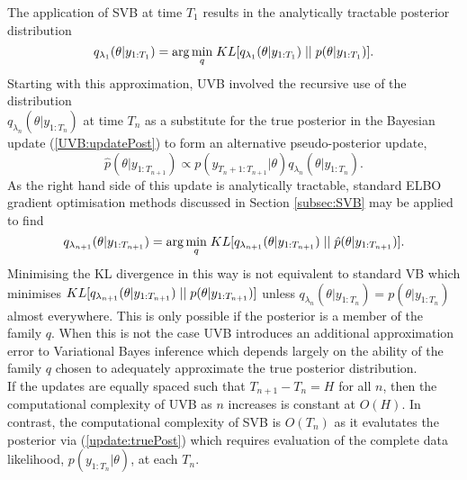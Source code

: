 \documentclass[
12pt, %
onehalfspacing, %
nohyperref, %
headsepline, %
chapterinoneline, %
]{MastersDoctoralThesis} %
\begin{document}
The application of SVB at time $T_1$ results in the analytically tractable posterior distribution
\begin{equation}
\label{UVB:Time1}
q_{\lambda_1}(\theta | y_{1:T_1}) = \arg \underset{q}{\min} \hspace{1mm} KL[q_{\lambda_1} (\theta | y_{1:T_1}) \hspace{.1cm}||\hspace{.1cm}p(\theta | y_{1:T_1})].
\end{equation}
Starting with this approximation, UVB involved the recursive use of the distribution \\ $q_{\lambda_n}(\theta | y_{1:T_n})$ at time $T_n$ as a substitute for the true posterior in the Bayesian update (\ref{UVB:updatePost}) to form an alternative pseudo-posterior update,
\begin{equation}
\label{UVB:pHatPosterior}
\hat{p}(\theta |  y_{1:T_{n+1}}) \propto p(y_{T_{n}+1:T_{n+1}} | \theta)q_{\lambda_{n}}(\theta | y_{1:T_{n}}).
\end{equation}
As the right hand side of this update is analytically tractable, standard ELBO gradient optimisation methods discussed in Section \ref{subsec:SVB} may be applied to find  
\begin{equation}
\label{UVB:TimeNp1}
q_{\lambda_{n+1}}(\theta | y_{1:T_{n+1}}) = \arg \underset{q}{\min} \hspace{1mm} KL[q_{\lambda_{n+1}} (\theta | y_{1:T_{n+1}}) \hspace{.1cm}||\hspace{.1cm}\hat{p}(\theta | y_{1:T_{n+1}})].
\end{equation}
Minimising the KL divergence in this way is not equivalent to standard VB which minimises $KL[q_{\lambda_{n+1}} (\theta | y_{1:T_{n+1}}) \hspace{.1cm}||\hspace{.1cm}p(\theta | y_{1:T_{n+1}})]$ unless $q_{\lambda_{n}}(\theta |  y_{1:T_{n}}) = p(\theta |  y_{1:T_{n}})$ almost everywhere. This is only possible if the posterior is a member of the family $q$. When this is not the case UVB introduces an additional approximation error to Variational Bayes inference which depends largely on the ability of the family $q$ chosen to adequately approximate the true posterior distribution.
\\

If the updates are equally spaced such that $T_{n+1} - T_{n} = H$ for all $n$, then the computational complexity of UVB as $n$ increases is constant at $O(H)$. In contrast, the computational complexity of SVB is $O(T_{n})$ as it evalutates the posterior via (\ref{update:truePost}) which requires evaluation of the complete data likelihood, $p(y_{1:T_{n}} | \theta)$, at each $T_{n}$.
\\
\end{document}
